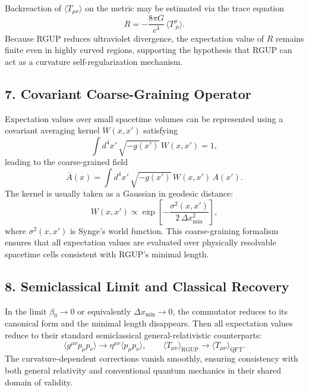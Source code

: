\documentclass[11pt,oneside]{book}
\numberwithin{equation}{chapter}
\begin{document}
Backreaction of $\langle T_{\mu\nu}\rangle$ on the metric may be estimated via the trace equation
\begin{equation}
R = -\frac{8\pi G}{c^4}\,\langle T^\mu_{\ \mu}\rangle.
\end{equation}
Because RGUP reduces ultraviolet divergence, the expectation value of $R$ remains finite even in highly curved regions, supporting the hypothesis that RGUP can act as a curvature self-regularization mechanism.

\subsection*{7. Covariant Coarse-Graining Operator}

Expectation values over small spacetime volumes can be represented using a covariant averaging kernel $W(x,x')$ satisfying
\begin{equation}
\int d^4x'\,\sqrt{-g(x')}\,W(x,x') = 1,
\end{equation}
leading to the coarse-grained field
\begin{equation}
\bar{A}(x)
= \int d^4x'\,\sqrt{-g(x')}\,W(x,x')\,A(x').
\end{equation}
The kernel is usually taken as a Gaussian in geodesic distance:
\begin{equation}
W(x,x') \propto
\exp\!\left[-\frac{\sigma^2(x,x')}{2\,\Delta x_{\min}^2}\right],
\end{equation}
where $\sigma^2(x,x')$ is Synge’s world function.  
This coarse-graining formalism ensures that all expectation values are evaluated over physically resolvable spacetime cells consistent with RGUP’s minimal length.

\subsection*{8. Semiclassical Limit and Classical Recovery}

In the limit $\beta_0 \to 0$ or equivalently $\Delta x_{\min}\to 0$, the commutator reduces to its canonical form and the minimal length disappears.  
Then all expectation values reduce to their standard semiclassical general-relativistic counterparts:
\begin{equation}
\langle g^{\mu\nu}p_\mu p_\nu \rangle
\to \eta^{\mu\nu}\langle p_\mu p_\nu \rangle,
\qquad
\langle T_{\mu\nu}\rangle_{\text{RGUP}}
\to \langle T_{\mu\nu}\rangle_{\text{QFT}}.
\end{equation}
The curvature-dependent corrections vanish smoothly, ensuring consistency with both general relativity and conventional quantum mechanics in their shared domain of validity.
\end{document}
